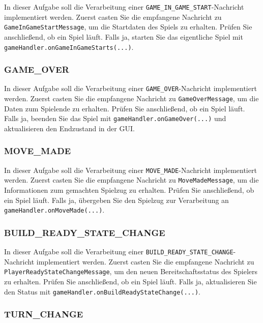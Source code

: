 \documentclass[12pt]{article}
\begin{document}
In dieser Aufgabe soll die Verarbeitung einer \texttt{GAME\_IN\_GAME\_START}-Nachricht implementiert werden. 
Zuerst casten Sie die empfangene Nachricht zu \texttt{GameInGameStartMessage}, 
um die Startdaten des Spiels zu erhalten. 
Prüfen Sie anschließend, ob ein Spiel läuft. 
Falls ja, starten Sie das eigentliche Spiel mit \texttt{gameHandler.onGameInGameStarts(...)}.

\subsubsection*{GAME\_OVER}

In dieser Aufgabe soll die Verarbeitung einer \texttt{GAME\_OVER}-Nachricht implementiert werden. 
Zuerst casten Sie die empfangene Nachricht zu \texttt{GameOverMessage}, 
um die Daten zum Spielende zu erhalten. 
Prüfen Sie anschließend, ob ein Spiel läuft. 
Falls ja, beenden Sie das Spiel mit \texttt{gameHandler.onGameOver(...)} 
und aktualisieren den Endzustand in der GUI.

\subsubsection*{MOVE\_MADE}

In dieser Aufgabe soll die Verarbeitung einer \texttt{MOVE\_MADE}-Nachricht implementiert werden. 
Zuerst casten Sie die empfangene Nachricht zu \texttt{MoveMadeMessage}, 
um die Informationen zum gemachten Spielzug zu erhalten. 
Prüfen Sie anschließend, ob ein Spiel läuft. 
Falls ja, übergeben Sie den Spielzug zur Verarbeitung an \texttt{gameHandler.onMoveMade(...)}.

\subsubsection*{BUILD\_READY\_STATE\_CHANGE}

In dieser Aufgabe soll die Verarbeitung einer \texttt{BUILD\_READY\_STATE\_CHANGE}-Nachricht implementiert werden. 
Zuerst casten Sie die empfangene Nachricht zu 
\texttt{PlayerReadyState\hspace{0pt}ChangeMessage}, um den neuen Bereitschaftsstatus 
des Spielers zu erhalten. Prüfen Sie anschließend, ob ein Spiel läuft. 
Falls ja, aktualisieren Sie den Status mit \texttt{gameHandler.\hspace{0pt}onBuildReadyStateChange(...)}.

\subsubsection*{TURN\_CHANGE}
\end{document}
